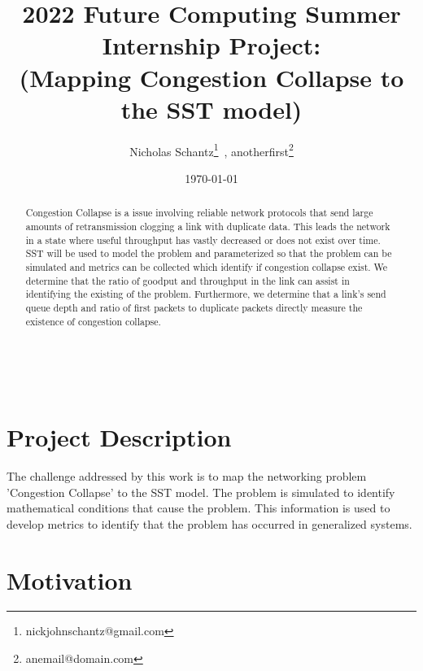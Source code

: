 \documentclass{article}
\begin{document}
    \begin{minipage}[h]{\textwidth}
        \title{2022 Future Computing Summer Internship Project:\\(Mapping Congestion Collapse to the SST model)}
        \author{Nicholas Schantz\footnote{nickjohnschantz@gmail.com}\ , 
        anotherfirst\footnote{anemail@domain.com}}
        \date{\today}
            \maketitle
        \begin{abstract}
            Congestion Collapse is a issue involving reliable network protocols that send large amounts of retransmission clogging a link with duplicate data. This leads the network in a state where useful throughput has vastly decreased or does not exist over time. SST will be used to model the problem and parameterized so that the problem can be simulated and metrics can be collected which identify if congestion collapse exist. We determine that the ratio of goodput and throughput in the link can assist in identifying the existing of the problem. Furthermore, we determine that a link's send queue depth and ratio of first packets to duplicate packets directly measure the existence of congestion collapse.
        \end{abstract}
    \end{minipage}

\ \\


\section{Project Description} %

The challenge addressed by this work is to map the networking problem 'Congestion Collapse' to the SST model. The problem is simulated to identify mathematical conditions that cause the problem. This information is used to develop metrics to identify that the problem has occurred in generalized systems.

\section{Motivation} %
\end{document}
